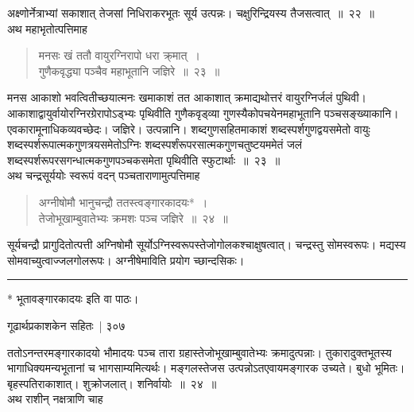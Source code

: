 \documentclass[11pt, openany]{book}
\begin{document}
अक्ष्णोर्नेत्राभ्यां सकाशात् तेजसां निधिराकरभूतः सूर्य उत्पन्नः। चक्षुरिन्द्रियस्य तैजसत्वात्~॥~२२~॥\\
\noindent अथ महाभृतोत्पत्तिमाह \textendash

 \begin{quote}
{\ssi  मनसः खं ततौ वायुरग्निरापो धरा क्र्मात्~।\\
गुणैकवृद्ध्या पञ्चैव महाभूतानि जज्ञिरे~॥~२३~॥ }
\end{quote}

 मनस आकाशो भवत्वितीच्छयात्मनः खमाकाशं तत आकाशात् क्रमाद्यथोत्तरं वायुरग्निर्जलं पुथिवी। आकाशाद्वायुर्वायोरग्निरग्रेरापोऽड्भ्यः पृथिवीति गुणैकवृड्व्या गुणस्यैकोपचयेनमहाभूतानि पञ्चसङ्ख्याकानि। एवकारामूनाधिकव्यवच्छेदः। जज्ञिरे। उत्पन्नानि। शब्दगुणसहितमाकाशं शब्दस्पर्शगुणद्वयसमेतो वायुः शब्दस्पर्शरूपात्मकगुणत्रयसमेतोऽग्निः शब्दस्पर्शंरूपरसात्मकगुणचतुष्टयममेतं जलं शब्दस्पर्शरूपरसगन्धात्मकगुणपञ्चकसमेता पृथिवीति स्फुटार्थाः~॥~२३~॥\\
\noindent  अथ चन्द्रसूर्ययोः स्वरूपं वदन् पञ्चताराणामुत्पत्तिमाह \textendash

\begin{quote}
{\ssi अग्नीषोमौ भानुचन्द्रौ ततस्त्वङ्गारकादयः*~।\\
तेजोभूखाम्बुवातेभ्यः क्रमशः पञ्च जज्ञिरे~॥~२४~॥}
\end{quote}

 सूर्यचन्द्रौ प्रागुदितोत्पत्ती अग्निषोमौ सूर्योऽग्निस्वरूपस्तेजोगोलकश्चाक्षुषत्वात्। चन्द्रस्तु सोमस्वरूपः। मद्यस्य सोमवाच्युत्वाज्जलगोलरूपः। अग्नीषेमाविति प्रयोग च्छान्दसिकः। 



\noindent\rule{\linewidth}{.5pt}

\begin{center}
 * भूतावङ्गारकादयः इति वा पाठः।
\end{center}


\newpage


\hspace{3cm} गूढार्थप्रकाशकेन सहितः~| \hfill ३०७
\vspace{1cm}


\noindent ततोऽनन्तरमङ्गारकादयो भौमादयः पञ्च तारा ग्रहास्तेजोभूखाम्बुवातेभ्यः क्रमादुत्पन्नाः। तुकारादुक्तभूतस्य भागाधिक्यमन्यभूतानां च भागसाम्यमित्यर्थः। मङ्गलस्तेजस उत्पन्नोऽतएवायमङ्गारक उच्यते। बुधो भूमितः। बृहस्पतिराकाशात्। शुक्रोजलात्। शनिर्वायोः~॥~२४~॥\\
अथ राशीन् नक्षत्राणि चाह \textendash
\end{document}
